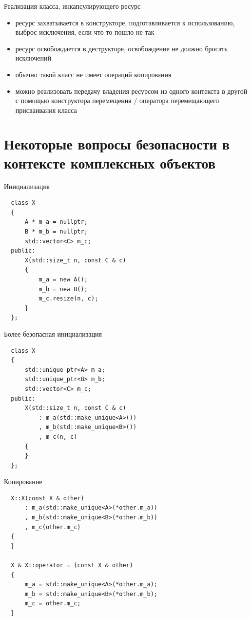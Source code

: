 \documentclass[unknownkeysallowed,xcolor=table]{beamer}
\begin{document}
\begin{frame}{Реализация класса, инкапсулирующего ресурс}
  \begin{itemize}
    \item ресурс захватывается в конструкторе, подготавливается к использованию, выброс исключения, если что-то пошло не так \vspace{1em}
    \item ресурс освобождается в деструкторе, освобождение не должно бросать исключений \vspace{1em}
    \item обычно такой класс не имеет операций копирования \vspace{1em}
    \item можно реализовать передачу владения ресурсом из одного контекста в другой с помощью конструктора перемещения / оператора перемещающего присваивания класса
  \end{itemize}
\end{frame}

\section{Некоторые вопросы безопасности в контексте комплексных объектов}

\begin{frame}[fragile]{Инициализация}
  \begin{lstlisting}
  class X
  {
      A * m_a = nullptr;
      B * m_b = nullptr;
      std::vector<C> m_c;
  public:
      X(std::size_t n, const C & c)
      {
          m_a = new A();
          m_b = new B();
          m_c.resize(n, c);
      }
  };
  \end{lstlisting}
\end{frame}

\begin{frame}[fragile]{Более безопасная инициализация}
  \begin{lstlisting}
  class X
  {
      std::unique_ptr<A> m_a;
      std::unique_ptr<B> m_b;
      std::vector<C> m_c;
  public:
      X(std::size_t n, const C & c)
          : m_a(std::make_unique<A>())
          , m_b(std::make_unique<B>())
          , m_c(n, c)
      {
      }
  };
  \end{lstlisting}
\end{frame}

\begin{frame}[fragile]{Копирование}
  \begin{lstlisting}
  X::X(const X & other)
      : m_a(std::make_unique<A>(*other.m_a))
      , m_b(std::make_unique<B>(*other.m_b))
      , m_c(other.m_c)
  {
  }

  X & X::operator = (const X & other)
  {
      m_a = std::make_unique<A>(*other.m_a);
      m_b = std::make_unique<B>(*other.m_b);
      m_c = other.m_c;
  }
  \end{lstlisting}
\end{frame}
\end{document}
